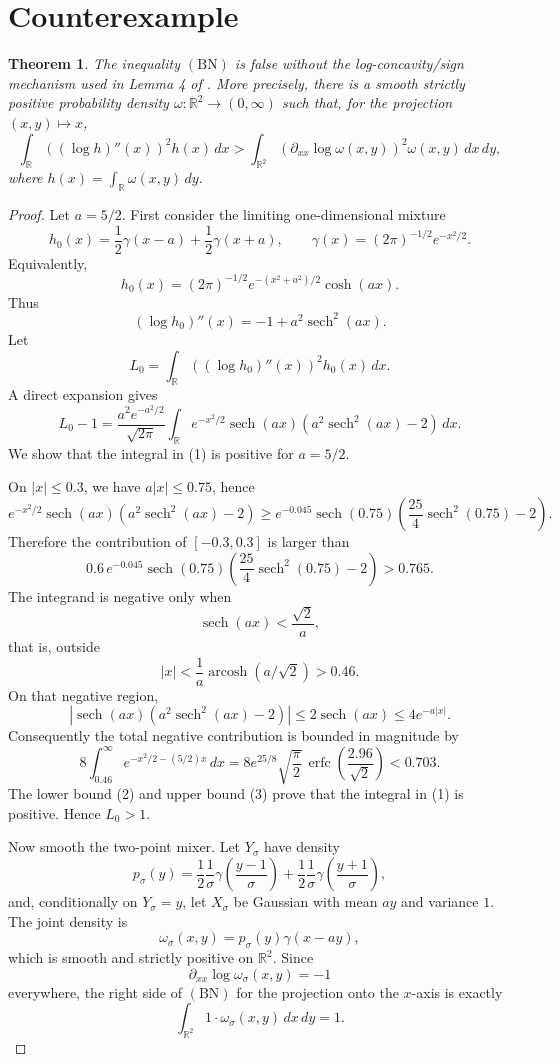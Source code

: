 \documentclass[11pt]{article}
\newtheorem*{theorem}{Theorem}
\newcommand{\R}{\mathbb R}
\newcommand{\sech}{\operatorname{sech}}
\begin{document}
\section*{Counterexample}

\begin{theorem}
The inequality \((\mathrm{BN})\) is false without the log-concavity/sign
mechanism used in Lemma 4 of \cite{BallNguyen2012}.  More precisely, there is
a smooth strictly positive probability density
\(\omega:\R^2\to(0,\infty)\) such that, for the projection
\((x,y)\mapsto x\),
\[
  \int_{\R}\left((\log h)''(x)\right)^2 h(x)\,dx
  >
  \int_{\R^2}\left(\partial_{xx}\log\omega(x,y)\right)^2
  \omega(x,y)\,dx\,dy,
\]
where \(h(x)=\int_{\R}\omega(x,y)\,dy\).
\end{theorem}

\begin{proof}
Let \(a=5/2\).  First consider the limiting one-dimensional mixture
\[
  h_0(x)=\frac12\gamma(x-a)+\frac12\gamma(x+a),
  \qquad
  \gamma(x)=(2\pi)^{-1/2}e^{-x^2/2}.
\]
Equivalently,
\[
  h_0(x)=(2\pi)^{-1/2}e^{-(x^2+a^2)/2}\cosh(ax).
\]
Thus
\[
  (\log h_0)''(x)=-1+a^2\sech^2(ax).
\]
Let
\[
  L_0=\int_\R \left((\log h_0)''(x)\right)^2h_0(x)\,dx .
\]
A direct expansion gives
\[
  L_0-1
  =
  \frac{a^2e^{-a^2/2}}{\sqrt{2\pi}}
  \int_\R e^{-x^2/2}\sech(ax)
  \left(a^2\sech^2(ax)-2\right)\,dx .
  \tag{1}
\]
We show that the integral in (1) is positive for \(a=5/2\).

On \(|x|\leq 0.3\), we have \(a|x|\leq0.75\), hence
\[
  e^{-x^2/2}\sech(ax)\left(a^2\sech^2(ax)-2\right)
  \geq
  e^{-0.045}\sech(0.75)
  \left(\frac{25}{4}\sech^2(0.75)-2\right).
\]
Therefore the contribution of \([-0.3,0.3]\) is larger than
\[
  0.6\,e^{-0.045}\sech(0.75)
  \left(\frac{25}{4}\sech^2(0.75)-2\right)>0.765.
  \tag{2}
\]
The integrand is negative only when
\[
  \sech(ax)<\frac{\sqrt2}{a},
\]
that is, outside
\[
  |x|<\frac{1}{a}\operatorname{arcosh}(a/\sqrt2)>0.46.
\]
On that negative region,
\[
  \left|\sech(ax)(a^2\sech^2(ax)-2)\right|
  \leq 2\sech(ax)\leq 4e^{-a|x|}.
\]
Consequently the total negative contribution is bounded in magnitude by
\[
  8\int_{0.46}^{\infty}e^{-x^2/2-(5/2)x}\,dx
  =
  8e^{25/8}\sqrt{\frac{\pi}{2}}\,
  \operatorname{erfc}\!\left(\frac{2.96}{\sqrt2}\right)
  <0.703 .
  \tag{3}
\]
The lower bound (2) and upper bound (3) prove that the integral in (1) is
positive.  Hence \(L_0>1\).

Now smooth the two-point mixer.  Let \(Y_\sigma\) have density
\[
  p_\sigma(y)=\frac12\frac{1}{\sigma}\gamma\!\left(\frac{y-1}{\sigma}\right)
  +\frac12\frac{1}{\sigma}\gamma\!\left(\frac{y+1}{\sigma}\right),
\]
and, conditionally on \(Y_\sigma=y\), let \(X_\sigma\) be Gaussian with mean
\(ay\) and variance \(1\).  The joint density is
\[
  \omega_\sigma(x,y)=p_\sigma(y)\gamma(x-ay),
\]
which is smooth and strictly positive on \(\R^2\).  Since
\[
  \partial_{xx}\log\omega_\sigma(x,y)=-1
\]
everywhere, the right side of \((\mathrm{BN})\) for the projection onto the
\(x\)-axis is exactly
\[
  \int_{\R^2}1\cdot\omega_\sigma(x,y)\,dx\,dy=1.
\]


\end{proof}
\end{document}
